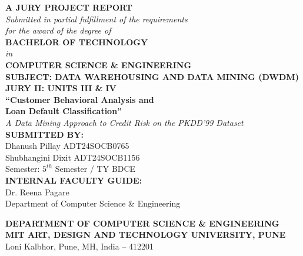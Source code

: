 \documentclass[12pt, a4paper]{report}
\begin{document}

\begin{titlepage}
    \centering
    \vspace*{0.5cm}
    
    {\Large \textbf{A JURY PROJECT REPORT}}\\[0.3cm]
    \textit{Submitted in partial fulfillment of the requirements} \\
    \textit{for the award of the degree of}\\[0.3cm]
    
    {\Large \textbf{BACHELOR OF TECHNOLOGY}} \\
    \textit{in} \\
    {\large \textbf{COMPUTER SCIENCE \& ENGINEERING}}\\[0.3cm]
    
    \textcolor{mitpurple}{\textbf{SUBJECT: DATA WAREHOUSING AND DATA MINING (DWDM)}}\\[0.3cm]
    \textcolor{mitpurple}{\textbf{JURY II: UNITS III \& IV}}\\[0.8cm]
    
    {\LARGE \textbf{``Customer Behavioral Analysis and\\[0.2cm] Loan Default Classification''}}\\[0.35cm]
    {\large \textit{A Data Mining Approach to Credit Risk on the PKDD'99 Dataset}}\\[0.8cm]
    
    \textbf{SUBMITTED BY:}\\
    Dhanush Pillay \hspace{1cm} ADT24SOCB0765 \\
    Shubhangini Dixit \hspace{0.65cm} ADT24SOCB1156 \\
    Semester: $5^{th}$ Semester / TY BDCE \\[0.5cm]
    
    \textbf{INTERNAL FACULTY GUIDE:}\\
    Dr. Reena Pagare \\
    Department of Computer Science \& Engineering \\[0.5cm]
    
    \vfill
    
    \textbf{DEPARTMENT OF COMPUTER SCIENCE \& ENGINEERING}\\
    \textcolor{mitpurple}{\textbf{MIT ART, DESIGN AND TECHNOLOGY UNIVERSITY, PUNE}}\\
    Loni Kalbhor, Pune, MH, India -- 412201
\end{titlepage}
\end{document}
